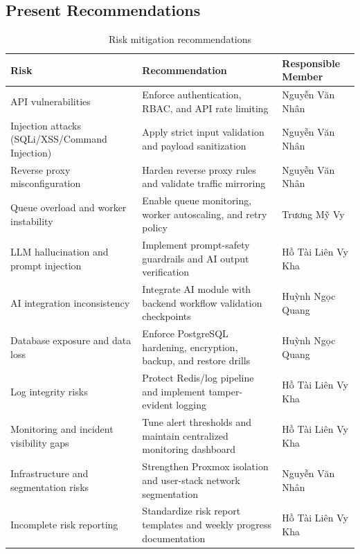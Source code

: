 \subsection{Present Recommendations}
\begin{table}[H]
    \centering
    \renewcommand{\arraystretch}{1.2}
    \begin{tabularx}{\textwidth}{|X|X|X|}
        \hline
        \textbf{Risk} & \textbf{Recommendation} & \textbf{Responsible Member} \\
        \hline
        API vulnerabilities & Enforce authentication, RBAC, and API rate limiting & Nguyễn Văn Nhân \\
        \hline
        Injection attacks (SQLi/XSS/Command Injection) & Apply strict input validation and payload sanitization & Nguyễn Văn Nhân \\
        \hline
        Reverse proxy misconfiguration & Harden reverse proxy rules and validate traffic mirroring & Nguyễn Văn Nhân \\
        \hline
        Queue overload and worker instability & Enable queue monitoring, worker autoscaling, and retry policy & Trương Mỹ Vy \\
        \hline
        LLM hallucination and prompt injection & Implement prompt-safety guardrails and AI output verification & Hồ Tài Liên Vy Kha \\
        \hline
        AI integration inconsistency & Integrate AI module with backend workflow validation checkpoints & Huỳnh Ngọc Quang \\
        \hline
        Database exposure and data loss & Enforce PostgreSQL hardening, encryption, backup, and restore drills & Huỳnh Ngọc Quang \\
        \hline
        Log integrity risks & Protect Redis/log pipeline and implement tamper-evident logging & Hồ Tài Liên Vy Kha \\
        \hline
        Monitoring and incident visibility gaps & Tune alert thresholds and maintain centralized monitoring dashboard & Hồ Tài Liên Vy Kha \\
        \hline
        Infrastructure and segmentation risks & Strengthen Proxmox isolation and user-stack network segmentation & Nguyễn Văn Nhân \\
        \hline
        Incomplete risk reporting & Standardize risk report templates and weekly progress documentation & Hồ Tài Liên Vy Kha \\
        \hline
    \end{tabularx}
    \caption{Risk mitigation recommendations}
\end{table}

